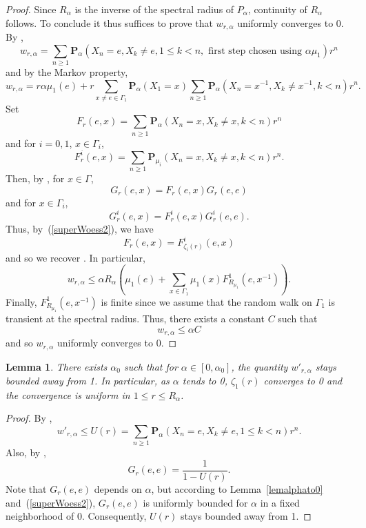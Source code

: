 \documentclass{amsart}
\newtheorem{lem}[thm]{Lemma}
\theoremstyle{definition}
\theoremstyle{remark}
\begin{document}
\begin{proof}
Since $R_\alpha$ is the inverse of the spectral radius of $P_\alpha$, continuity of $R_\alpha$ follows.
To conclude it thus suffices to prove that $w_{r,\alpha}$ uniformly converges to 0.
By \cite[Proposition~9.18]{Woessbook},
$$w_{r,\alpha}=\sum_{n\geq 1}\mathbf P_\alpha\left (X_n=e,X_k\neq e,1\leq k<n, \text{ first step chosen using }\alpha\mu_1\right )r^n$$
and by the Markov property,
$$w_{r,\alpha}=r\alpha\mu_1(e)+r\sum_{x\neq e\in \Gamma_1}\mathbf P_\alpha(X_1=x)\sum_{n\geq 1}\mathbf P_\alpha\left (X_n=x^{-1},X_k\neq x^{-1},k<n\right )r^n.$$
Set
\begin{equation}\label{defF}
F_r(e,x)=\sum_{n\geq 1}\mathbf P_\alpha\left (X_n=x,X_k\neq x,k<n\right )r^n
\end{equation}
and for $i=0,1$, $x\in \Gamma_i$,
\begin{equation}\label{defFi}
F_r^i(e,x)=\sum_{n\geq 1}\mathbf P_{\mu_i}\left (X_n=x,X_k\neq x,k<n\right )r^n.
\end{equation}
Then, by \cite[Lemma~1.13~(b)]{Woessbook}, for $x\in \Gamma$,
$$G_r(e,x)=F_r(e,x)G_r(e,e)$$
and for $x\in \Gamma_i$,
$$G_r^i(e,x)=F_r^i(e,x)G_r^i(e,e).$$
Thus, by~(\ref{superWoess2}), we have
$$F_r(e,x)=F_{\zeta_i(r)}^i(e,x)$$
and so we recover \cite[Proposition~9.18]{Woessbook}.
In particular,
$$w_{r,\alpha}\leq \alpha R_\alpha \left (\mu_1(e)+\sum_{x\in \Gamma_1}\mu_1(x)F_{R_{\mu_1}}^1(e,x^{-1})\right ).$$
Finally, $F_{R_{\mu_1}}^1(e,x^{-1})$ is finite since we assume that the random walk on $\Gamma_1$ is transient at the spectral radius.
Thus, there exists a constant $C$ such that
$$w_{r,\alpha}\leq \alpha C$$
and so $w_{r,\alpha}$ uniformly converges to 0.
\end{proof}




\begin{lem}\label{lemalphato1}
There exists $\alpha_0$ such that for $\alpha\in [0,\alpha_0]$, the quantity $w'_{r,\alpha}$ stays bounded away from 1.
In particular, as $\alpha$ tends to 0, $\zeta_1(r)$ converges to 0 and
the convergence is uniform in $1\leq r\leq R_\alpha$.
\end{lem}

\begin{proof}
By \cite[Proposition~9.18]{Woessbook},
$$w'_{r,\alpha}\leq U(r)=\sum_{n\geq 1}\mathbf P_\alpha (X_n=e,X_k\neq e,1\leq k<n)r^n.$$
Also, by \cite[Lemma~1.13]{Woessbook},
$$G_r(e,e)=\frac{1}{1-U(r)}.$$
Note that $G_r(e,e)$ depends on $\alpha$, but according to Lemma~\ref{lemalphato0} and~(\ref{superWoess2}), $G_r(e,e)$ is uniformly bounded for $\alpha$ in a fixed neighborhood of 0.
Consequently, $U(r)$ stays bounded away from 1.
\end{proof}
\end{document}
